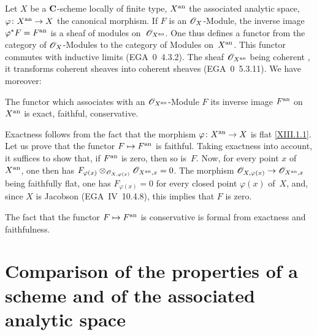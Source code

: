 \subsection{}
\label{XII.1.3}
Let $X$ be a $\mathbf{C}$-scheme locally of finite type, $X^{\mathrm{an}}$
the associated analytic space, $\varphi\colon X^{\an}\to X$ the
canonical morphism. If $F$ is an ${\cal{O}}_X$-Module, the inverse
image $\varphi^*F=F^{\mathrm{an}}$ is a sheaf of modules on~${\cal{O}}_{X^{\an}}$. One thus defines a functor from the
category of $\cal{O}_X$-Modules to the category of
Modules on~$X^{\mathrm{an}}$. This functor commutes with inductive limits
(EGA~0~4.3.2). The sheaf $\cal{O}_{X^{\an}}$ being coherent
\cite[~\S 2~th]{XII.4}, it transforms coherent sheaves into
coherent sheaves (EGA~0~5.3.11). We have moreover:

\begin{subproposition}
\label{XII.1.3.1}
The functor which associates with an $\cal{O}_{X^{\an}}$-Module $F$ its
inverse image $F^{\mathrm{an}}$ on~$X^{\mathrm{an}}$ is exact, faithful,
conservative.
\end{subproposition}

Exactness follows from the fact that the morphism $\varphi\colon
X^{\an}\to X$ is flat \eqref{XIII.1.1}. Let us prove that the functor $F\mto
F^{\an}$ is faithful. Taking exactness into account, it suffices to
show that, if $F^{\mathrm{an}}$ is zero, then so is~$F$. Now,
for every point $x$ of~$X^{\mathrm{an}}$, one then has $F_{\varphi
(x)}\otimes_{\cal{O}_{X,\varphi (x)}}\cal{O}_{X^{\an},x}=0$. The
morphism $\cal{O}_{X,\varphi (x)}\to \cal{O}_{X^{\an},x}$ being
faithfully flat, one has $F_{\varphi (x)}=0$ for every closed
point $\varphi (x)$ of~$X$, and, since $X$ is Jacobson
(EGA~IV~10.4.8), this implies that $F$ is zero.

The
fact that the functor $F\mto F^{\an}$ is conservative is formal
from exactness and faithfulness.

\section[Comparison of the properties of a scheme]{Comparison of the properties of a scheme and of the associated
analytic \hbox{space}}
\label{XII.2}

